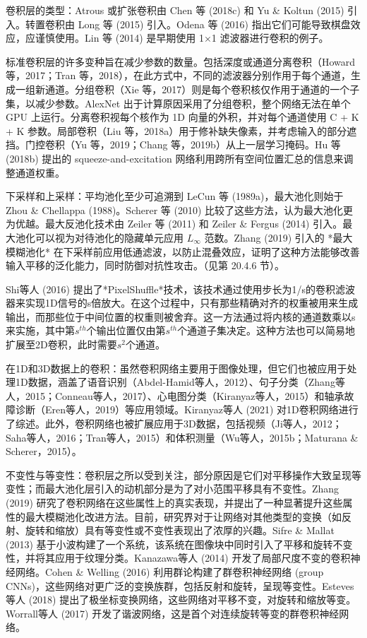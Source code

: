 \documentclass[lang=cn,newtx,10pt,scheme=chinese]{elegantbook}
\begin{document}
卷积层的类型：Atrous 或扩张卷积由 Chen 等 (2018c) 和 Yu \& Koltun (2015) 引入。转置卷积由 Long 等 (2015) 引入。Odena 等 (2016) 指出它们可能导致棋盘效应，应谨慎使用。Lin 等 (2014) 是早期使用 1×1 滤波器进行卷积的例子。

标准卷积层的许多变种旨在减少参数的数量。包括深度或通道分离卷积（Howard 等，2017；Tran 等，2018），在此方式中，不同的滤波器分别作用于每个通道，生成一组新通道。分组卷积（Xie 等，2017）则是每个卷积核仅作用于通道的一个子集，以减少参数。AlexNet 出于计算原因采用了分组卷积，整个网络无法在单个 GPU 上运行。分离卷积视每个核作为 1D 向量的外积，并对每个通道使用 C + K + K 参数。局部卷积（Liu 等，2018a）用于修补缺失像素，并考虑输入的部分遮挡。门控卷积（Yu 等，2019；Chang 等，2019b）从上一层学习掩码。Hu 等 (2018b) 提出的 squeeze-and-excitation 网络利用跨所有空间位置汇总的信息来调整通道权重。

下采样和上采样：平均池化至少可追溯到 LeCun 等 (1989a)，最大池化则始于 Zhou \& Chellappa (1988)。Scherer 等 (2010) 比较了这些方法，认为最大池化更为优越。最大反池化技术由 Zeiler 等 (2011) 和 Zeiler \& Fergus (2014) 引入。最大池化可以视为对待池化的隐藏单元应用 \(L_{\infty}\) 范数。Zhang (2019) 引入的 *最大模糊池化* 在下采样前应用低通滤波，以防止混叠效应，证明了这种方法能够改善输入平移的泛化能力，同时防御对抗性攻击。（见第 20.4.6 节）。

Shi等人 (2016) 提出了*PixelShuffle*技术，该技术通过使用步长为1/s的卷积滤波器来实现1D信号的s倍放大。在这个过程中，只有那些精确对齐的权重被用来生成输出，而那些位于中间位置的权重则被舍弃。这一方法通过将内核的通道数乘以s来实施，其中第\(s^{th}\)个输出位置仅由第\(s^{th}\)个通道子集决定。这种方法也可以简易地扩展至2D卷积，此时需要\(s^2\)个通道。

在1D和3D数据上的卷积：虽然卷积网络主要用于图像处理，但它们也被应用于处理1D数据，涵盖了语音识别（Abdel-Hamid等人，2012）、句子分类（Zhang等人，2015；Conneau等人，2017）、心电图分类（Kiranyaz等人，2015）和轴承故障诊断（Eren等人，2019）等应用领域。Kiranyaz等人 (2021) 对1D卷积网络进行了综述。此外，卷积网络也被扩展应用于3D数据，包括视频（Ji等人，2012；Saha等人，2016；Tran等人，2015）和体积测量（Wu等人，2015b；Maturana \& Scherer，2015）。

不变性与等变性：卷积层之所以受到关注，部分原因是它们对平移操作大致呈现等变性；而最大池化层引入的动机部分是为了对小范围平移具有不变性。Zhang (2019) 研究了卷积网络在这些属性上的真实表现，并提出了一种显著提升这些属性的最大模糊池化改进方法。目前，研究界对于让网络对其他类型的变换（如反射、旋转和缩放）具有等变性或不变性表现出了浓厚的兴趣。Sifre \& Mallat (2013) 基于小波构建了一个系统，该系统在图像块中同时引入了平移和旋转不变性，并将其应用于纹理分类。Kanazawa等人 (2014) 开发了局部尺度不变的卷积神经网络。Cohen \& Welling (2016) 利用群论构建了群卷积神经网络 (group CNNs)，这些网络对更广泛的变换族群，包括反射和旋转，呈现等变性。Esteves等人 (2018) 提出了极坐标变换网络，这些网络对平移不变，对旋转和缩放等变。Worrall等人 (2017) 开发了谐波网络，这是首个对连续旋转等变的群卷积神经网络。
\end{document}
